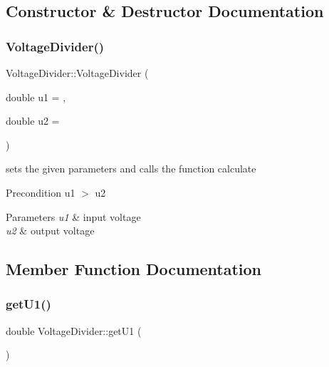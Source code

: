\subsection{Constructor \& Destructor Documentation}
\mbox{\label{classVoltageDivider_a7e71609cdfe3faa54ddfde5c7634a92c}} 
\subsubsection{\texorpdfstring{Voltage\+Divider()}{VoltageDivider()}}
{\footnotesize\ttfamily Voltage\+Divider\+::\+Voltage\+Divider (\begin{DoxyParamCaption}\item[{double}]{u1 = {},  }\item[{double}]{u2 = {} }\end{DoxyParamCaption})}



sets the given parameters and calls the function calculate 

\begin{DoxyPrecond}{Precondition}
u1 $>$ u2 
\end{DoxyPrecond}

\begin{DoxyParams}{Parameters}
{\em u1} & input voltage \\
\hline
{\em u2} & output voltage \\
\hline
\end{DoxyParams}


\subsection{Member Function Documentation}
\mbox{\label{classVoltageDivider_a36ab249dd0f1e5cb7b055affd249af6c}} 
\subsubsection{\texorpdfstring{get\+U1()}{getU1()}}
{\footnotesize\ttfamily double Voltage\+Divider\+::get\+U1 (\begin{DoxyParamCaption}{ }\end{DoxyParamCaption})}



